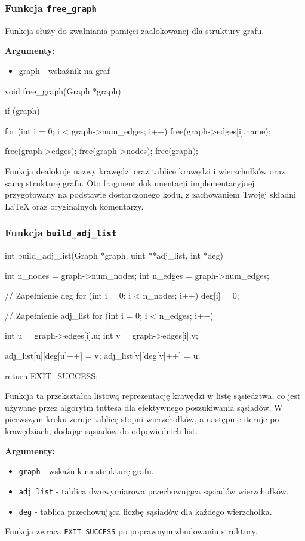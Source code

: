 \documentclass[]{article}
\begin{document}
\subsubsection{Funkcja \texttt{free\_graph}}
Funkcja służy do zwalniania pamięci zaalokowanej dla struktury grafu.

\textbf{Argumenty:}
\begin{itemize}
    \item graph - wskaźnik na graf
\end{itemize}

\begin{mylisting}
void free_graph(Graph *graph) {
    if (graph) {
        for (int i = 0; i < graph->num_edges; i++) {
            free(graph->edges[i].name);
        }

        free(graph->edges);
        free(graph->nodes);
        free(graph);
    }
}
\end{mylisting}
Funkcja dealokuje nazwy krawędzi oraz tablice krawędzi i wierzchołków oraz samą strukturę grafu.
Oto fragment dokumentacji implementacyjnej przygotowany na podstawie dostarczonego kodu, z zachowaniem Twojej składni LaTeX oraz oryginalnych komentarzy.



\subsubsection{Funkcja \texttt{build\_adj\_list}}
\begin{mylisting}
int build_adj_list(Graph *graph, uint **adj_list, int *deg) {
    int n_nodes = graph->num_nodes;
    int n_edges = graph->num_edges;

    // Zapełnienie deg
    for (int i = 0; i < n_nodes; i++)
        deg[i] = 0;

    // Zapełnienie adj_list
    for (int i = 0; i < n_edges; i++) {
        int u = graph->edges[i].u;
        int v = graph->edges[i].v;

        adj_list[u][deg[u]++] = v;
        adj_list[v][deg[v]++] = u;
    }
    return EXIT_SUCCESS;
}
\end{mylisting}
Funkcja ta przekształca listową reprezentację krawędzi w listę sąsiedztwa, co jest używane przez algorytm tuttesa dla efektywnego poszukiwania sąsiadów.
 W pierwszym kroku zeruje tablicę stopni wierzchołków, a następnie iteruje po krawędziach, dodając sąsiadów do odpowiednich list.

\textbf{Argumenty:}
\begin{itemize}
    \item \texttt{graph} - wskaźnik na strukturę grafu.
    \item \texttt{adj\_list} - tablica dwuwymiarowa przechowująca sąsiadów wierzchołków.
    \item \texttt{deg} - tablica przechowująca liczbę sąsiadów dla każdego wierzchołka.
\end{itemize}
Funkcja zwraca \texttt{EXIT\_SUCCESS} po poprawnym zbudowaniu struktury.
\end{document}
